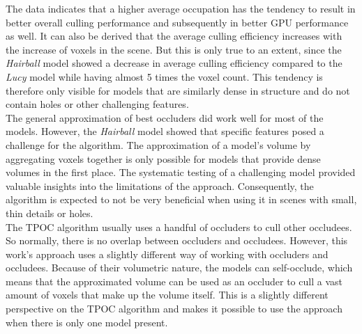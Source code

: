 The data indicates that a higher average occupation has the tendency to result in better overall culling performance and subsequently 
in better \ac{GPU} performance as well. It can also be derived that the average culling efficiency increases with the increase of 
voxels in the scene. But this is only true to an extent, since the \emph{Hairball} model showed a decrease in average culling efficiency 
compared to the \emph{Lucy} model while having almost 5 times the voxel count. This tendency is therefore only visible for models 
that are similarly dense in structure and do not contain holes or other challenging features.\\

\noindent
The general approximation of best occluders did work well for most of the models. However, the \emph{Hairball} model showed that specific 
features posed a challenge for the algorithm. The approximation of a model's volume by aggregating voxels together is only possible for 
models that provide dense volumes in the first place. The systematic testing of a challenging model provided valuable insights into the 
limitations of the approach. Consequently, the algorithm is expected to not be very beneficial when using it in scenes with small, thin 
details or holes.\\





\noindent
The \ac{TPOC} algorithm usually uses a handful of occluders to cull other occludees. So normally, there is no overlap between occluders and 
occludees. However, this work's approach uses a slightly different way of working with occluders and occludees. Because of their volumetric 
nature, the models can self-occlude, which means that the approximated volume can be used as an occluder to cull a vast amount of voxels that 
make up the volume itself. This is a slightly different perspective on the \ac{TPOC} algorithm and makes it possible to use the approach when 
there is only one model present. \\

